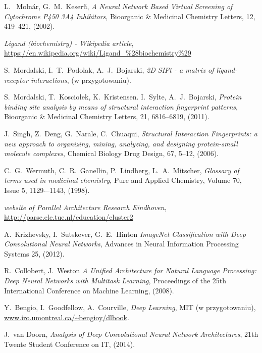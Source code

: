 \documentclass[a4paper,10pt]{report}
\begin{document}
\begin{thebibliography}{99}
     L.~ Moln\'{a}r, G.~M.~Keser\H{u},
     \textit{A Neural Network Based Virtual Screening of Cytochrome P450 3A4 Inhibitors},
     Bioorganic \& Medicinal Chemistry Letters, 12, 419--421,
     (2002).
     
     \textit{Ligand (biochemistry) - Wikipedia article},
     \url{https://en.wikipedia.org/wiki/Ligand_%28biochemistry%29} 

     S.~Mordalski, I.~T.~Podolak, A.~J.~Bojarski,
     \textit{2D SIFt - a matrix of ligand-receptor interactions},
     (w przygotowaniu).

     
     S.~Mordalski, T.~Kosciołek, K.~Kristensen. I.~Sylte, A.~J.~Bojarski,
     \textit{Protein binding site analysis by means of structural interaction fingerprint patterns},
     Bioorganic \& Medicinal Chemistry Letters, 21, 6816--6819,
     (2011).
      
      J.~Singh, Z.~Deng, G.~Narale, C.~Chuaqui,
      \textit{Structural Interaction Fingerprints: a new approach to organizing, mining, analyzing, and designing protein-small molecule complexes},
      Chemical Biology Drug Design, 67, 5--12,
      (2006).

      C.~G.~Wermuth, C.~R.~Ganellin, P.~Lindberg, L.~A.~Mitscher,
      \textit{Glossary of terms used in medicinal chemistry},
      Pure and Applied Chemistry, Volume 70, Issue 5, 1129-–1143,
      (1998).
      
      \textit{website of Parallel Architecture Research Eindhoven},
      \url{http://parse.ele.tue.nl/education/cluster2}
      
      A.~Krizhevsky, I.~Sutskever, G.~E.~Hinton
      \textit{ImageNet Classification with Deep Convolutional Neural Networks},
      Advances in Neural Information Processing Systems 25,
      (2012).

      R.~Collobert, J.~Weston
      \textit{A Unified Architecture for Natural Language Processing: Deep Neural Networks with Multitask Learning},
      Proceedings of the 25th International Conference on Machine Learning,
      (2008).
      
      Y.~Bengio, I.~Goodfellow, A.~Courville,
      \textit{Deep Learning},
      MIT (w przygotowaniu),
      \url{www.iro.umontreal.ca/~bengioy/dlbook}.

      J.~van Doorn,
      \emph{Analysis of Deep Convolutional Neural Network Architectures},
      21th Twente Student Conference on IT,
      (2014).
      

\end{thebibliography}
\end{document}
